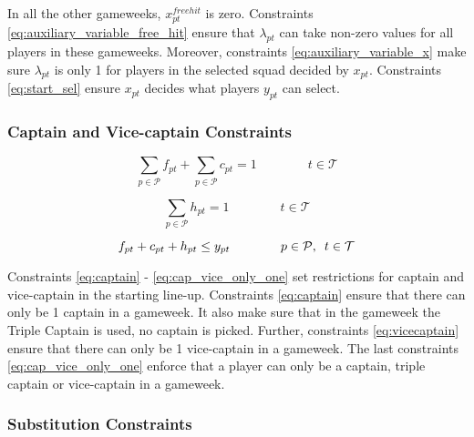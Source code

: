 \newpar

In all the other gameweeks, $x_{pt}^{freehit}$ is zero. Constraints \eqref{eq:auxiliary_variable_free_hit} ensure that $\lambda_{pt}$ can take non-zero values for all players in these gameweeks. Moreover, constraints \eqref{eq:auxiliary_variable_x} make sure $\lambda_{pt}$ is only 1 for players in the selected squad decided by $x_{pt}$. Constraints \eqref{eq:start_sel} ensure $x_{pt}$ decides what players $y_{pt}$ can select.

\subsubsection{Captain and Vice-captain Constraints}

\begin{equation} \label{eq:captain}
    \sum_{p \in \mathcal{P}} f_{pt} + \sum_{p \in \mathcal{P}} c_{pt} = 1 \qquad\qquad t \in \mathcal{T}
\end{equation}

\begin{equation} \label{eq:vicecaptain}
    \sum_{p \in \mathcal{P}} h_{pt} = 1 \qquad\qquad t \in \mathcal{T}
\end{equation}

\begin{equation} \label{eq:cap_vice_only_one}
   f_{pt} + c_{pt} + h_{pt} \leq y_{pt}  \qquad\qquad p \in \mathcal{P}, \enskip t \in \mathcal{T}
\end{equation}

Constraints \eqref{eq:captain} - \eqref{eq:cap_vice_only_one} set restrictions for captain and vice-captain in the starting line-up. Constraints \eqref{eq:captain} ensure that there can only be 1 captain in a gameweek. It also make sure that in the gameweek the Triple Captain is used, no captain is picked. Further, constraints \eqref{eq:vicecaptain} ensure that there can only be 1 vice-captain in a gameweek. The last constraints \eqref{eq:cap_vice_only_one} enforce that a player can only be a captain, triple captain or vice-captain in a gameweek. 

\subsubsection{Substitution Constraints}



